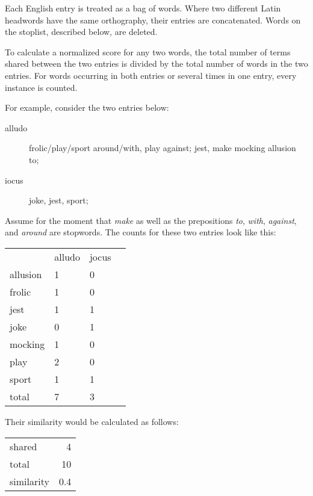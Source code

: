 \documentclass[]{article}
\begin{document}
		Each English entry is treated as a bag of words.  Where two different Latin headwords have the same orthography, their entries are concatenated.  Words on the stoplist, described below, are deleted.

		To calculate a normalized score for any two words, the total number of terms shared between the two entries is divided by the total number of words in the two entries.  For words occurring in both entries or several times in one entry, every instance is counted.
		
		For example, consider the two entries below:
		
		\vspace{1em}
		
		\begin{description}
			\item[alludo] frolic/play/sport around/with, play against; jest, make mocking allusion to; 
			\item[iocus] joke, jest, sport;
		\end{description}
		
		Assume for the moment that \emph{make} as well as the prepositions \emph{to}, \emph{with}, \emph{against}, and \emph{around} are stopwords.  The counts for these two entries look like this:
		
		\begin{tabular}{llll}
						&	alludo	&	jocus	\\
			allusion	&	1			&	0		\\
			frolic	&	1			&	0		\\
			jest		&	1			&	1		\\
			joke		&	0			&	1		\\
			mocking	&	1			&	0		\\
			play		&	2			&	0		\\
			sport		&	1			&	1		\\
			\hline
			total		&	7			&	3		\\
		\end{tabular}
		
		\vspace{1em}
		
		Their similarity would be calculated as follows:
		
		\vspace{1em}
		
		\begin{tabular}{lr}

			shared		&	4		\\
			total			&	10		\\
			\hline
			similarity	&	0.4	\\
		\end{tabular}
		
\end{document}
